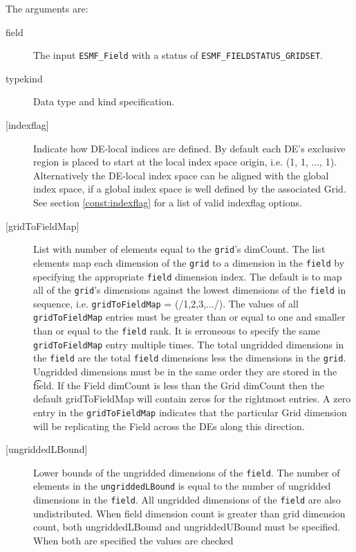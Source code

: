   
   The arguments are:
   \begin{description}
   \item[field]
   \begin{sloppypar}
   The input {\tt ESMF\_Field} with a status of
   {\tt ESMF\_FIELDSTATUS\_GRIDSET}.
   \end{sloppypar}
   \item[typekind]
   Data type and kind specification.
   \item[{[indexflag]}]
   Indicate how DE-local indices are defined. By default each DE's
   exclusive region is placed to start at the local index space origin,
   i.e. (1, 1, ..., 1). Alternatively the DE-local index space can be
   aligned with the global index space, if a global index space is well
   defined by the associated Grid. See section \ref{const:indexflag}
   for a list of valid indexflag options.
   \item [{[gridToFieldMap]}]
   List with number of elements equal to the
   {\tt grid}'s dimCount. The list elements map each dimension
   of the {\tt grid} to a dimension in the {\tt field} by
   specifying the appropriate {\tt field} dimension index. The default is to
   map all of the {\tt grid}'s dimensions against the lowest dimensions of
   the {\tt field} in sequence, i.e. {\tt gridToFieldMap} = (/1,2,3,.../).
   The values of all {\tt gridToFieldMap} entries must be greater than or equal
   to one and smaller than or equal to the {\tt field} rank.
   It is erroneous to specify the same {\tt gridToFieldMap} entry
   multiple times. The total ungridded dimensions in the {\tt field}
   are the total {\tt field} dimensions less
   the dimensions in
   the {\tt grid}. Ungridded dimensions must be in the same order they are
   stored in the {\t field}.
   If the Field dimCount is less than the Grid dimCount then the default
   gridToFieldMap will contain zeros for the rightmost entries. A zero
   entry in the {\tt gridToFieldMap} indicates that the particular
   Grid dimension will be replicating the Field across the DEs along
   this direction.
   \item [{[ungriddedLBound]}]
   Lower bounds of the ungridded dimensions of the {\tt field}.
   The number of elements in the {\tt ungriddedLBound} is equal to the number of ungridded
   dimensions in the {\tt field}. All ungridded dimensions of the
   {\tt field} are also undistributed. When field dimension count is
   greater than grid dimension count, both ungriddedLBound and ungriddedUBound
   must be specified. When both are specified the values are checked

\end{description}
